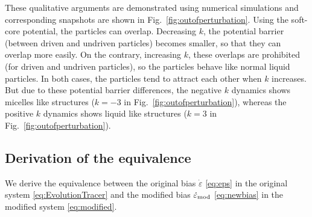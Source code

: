 \documentclass[pre, superscriptaddress, twocolumn,pre]{revtex4-1}
\begin{document}
These qualitative arguments are demonstrated using numerical simulations and corresponding snapshots are shown in Fig.~\ref{fig:outofperturbation}. Using the soft-core potential, the particles can overlap. Decreasing $k$, the potential barrier (between driven and undriven particles) becomes smaller, so that they can overlap more easily. On the contrary, increasing $k$, these overlaps are prohibited (for driven and undriven particles), so the particles behave like normal liquid particles. In both cases, the particles tend to attract each other when $k$ increases. But due to these potential barrier differences, the negative $k$ dynamics shows micelles like structures ($k=-3$ in Fig.~\ref{fig:outofperturbation}), whereas the positive $k$ dynamics shows liquid like structures ($k=3$ in Fig.~\ref{fig:outofperturbation}).






\subsection{Derivation of the equivalence}

We derive the equivalence between the original bias $\dot \varepsilon$ \eqref{eq:eps} in the original system \eqref{eq:EvolutionTracer} and the modified bias $\dot \varepsilon_{\rm mod}$ \eqref{eq:newbias} in the modified system \eqref{eq:modified}.
\end{document}
